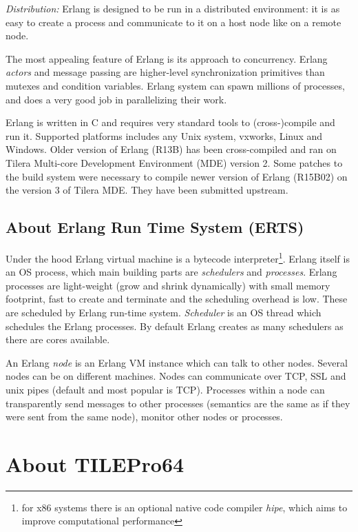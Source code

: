 \documentclass[english,11pt]{article}
\begin{document}
{\em Distribution:} Erlang is designed to be run in a distributed
environment: it is as easy to create a process and communicate to
it on a host node like on a remote node.

The most appealing feature of Erlang is its approach to concurrency. Erlang {\em
actors} and message passing are higher-level synchronization primitives than
mutexes and condition variables. Erlang system can spawn millions of processes,
and does a very good job in parallelizing their work.

Erlang is written in C and requires very standard tools to (cross-)compile and
run it. Supported platforms includes any Unix system, vxworks, Linux and
Windows. Older version of Erlang (R13B) has been cross-compiled and ran on
Tilera Multi-core Development Environment (MDE) version 2. Some patches to the
build system were necessary to compile newer version of Erlang (R15B02) on the
version 3 of Tilera MDE. They have been submitted upstream.

\subsection{About Erlang Run Time System (ERTS)}

Under the hood Erlang virtual machine is a bytecode interpreter\footnote{for x86
systems there is an optional native code compiler \emph{hipe}\cite{hipe}, which
aims to improve computational performance}. Erlang itself is an OS process,
which main building parts are {\em schedulers} and {\em processes}. Erlang
processes are light-weight (grow and shrink dynamically) with small memory
footprint, fast to create and terminate and the scheduling overhead is low.
These are scheduled by Erlang run-time system. {\em Scheduler} is an OS thread
which schedules the Erlang processes. By default Erlang creates as many
schedulers as there are cores available.

An Erlang {\em node} is an Erlang VM instance which can talk to other nodes.
Several nodes can be on different machines. Nodes can communicate over TCP, SSL
and unix pipes (default and most popular is TCP). Processes within a node can
transparently send messages to other processes (semantics are the same as if
they were sent from the same node), monitor other nodes or processes.

\section{About TILEPro64}
\label{sec:tilera}
\end{document}
